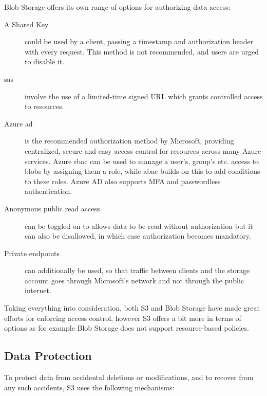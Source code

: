 Blob Storage offers its own range of options for authorizing data access: ~\cite{blob_authorization,blob_endpoint}

\begin{description}
    \item[A Shared Key] could be used by a client, passing a timestamp and authorization header with every request. This method is not recommended, and users are urged to disable it.

    \item[\ac{sas}] involve the use of a limited-time signed URL which grants controlled access to resources.

    \item[Azure \ac{ad}] is the recommended authorization method by Microsoft, providing centralized, secure and easy access control for resources across many Azure services. Azure \ac{rbac} can be used to manage a user's, group's etc. access to blobs by assigning them a role, while \ac{abac} builds on this to add conditions to these roles. Azure AD also supports MFA and passwordless authentication.

    \item[Anonymous public read access] can be toggled on to allows data to be read without authorization but it can also be disallowed, in which case authorization becomes mandatory.

    \item[Private endpoints] can additionally be used, so that traffic between clients and the storage account goes through Microsoft's network and not through the public internet.
\end{description}

Taking everything into consideration, both S3 and Blob Storage have made great efforts for enforcing access control, however S3 offers a bit more in terms of options as for example Blob Storage does not support resource-based policies.

\subsection{Data Protection}
To protect data from accidental deletions or modifications, and to recover from any such accidents, S3 uses the following mechanisms: ~\cite{s3faq}

